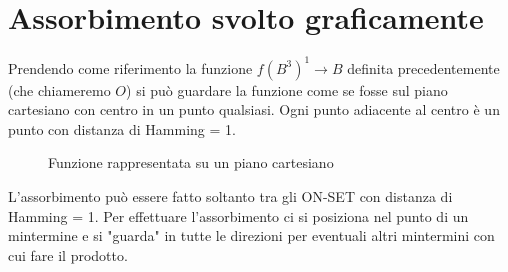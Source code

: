 \documentclass[a4paper]{article}
\theoremstyle{break}
\theoremstyle{break}
\theoremstyle{break}
\theoremstyle{break}
\begin{document}
\section{Assorbimento svolto graficamente}
Prendendo come riferimento la funzione \( f(B^3)^1 \to B \)  definita precedentemente (che chiameremo \( O \)) 
si può guardare la funzione come se fosse sul piano cartesiano con centro in
un punto qualsiasi. Ogni punto adiacente al centro è un punto con distanza di
Hamming = 1.
\begin{figure}[H]
    \begin{center}
    \end{center}
    \caption{Funzione rappresentata su un piano cartesiano}
\end{figure}
L'assorbimento può essere fatto soltanto tra gli ON-SET con distanza di
Hamming = 1.
Per effettuare l'assorbimento ci si posiziona nel punto di un mintermine e si
"guarda" in tutte le direzioni per eventuali altri mintermini con cui fare il
prodotto.
\end{document}

